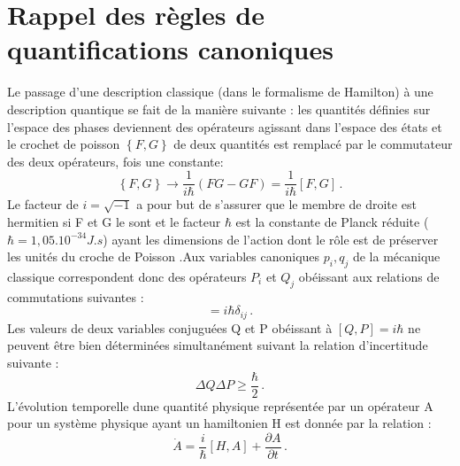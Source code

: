 \documentclass[12pt,a4paper, openany]{report}
\begin{document}
	\section{Rappel des règles de quantifications canoniques}
	Le passage d’une description classique (dans le formalisme de Hamilton) à une description quantique se fait de la manière suivante : les quantités définies sur l'espace des phases deviennent des opérateurs agissant dans l'espace des états et le crochet de poisson $\left\{F,G\right\}$ de deux quantités est remplacé par le commutateur des deux opérateurs, fois une constante:
	\begin{equation}
		\left\{F,G\right\} \rightarrow{\frac{1}{i{\hbar}}(FG-GF)}=\frac{1}{i{\hbar}}[F , G]\, .  
	\end{equation} 
Le facteur de $i=\sqrt{-1}$ a pour but de s’assurer que le membre de droite est hermitien si F et G le sont et le facteur $\hbar$ est la constante de Planck réduite ($\hbar=1,05.10^{-34} J.s$) ayant les dimensions de l'action dont le r\^{o}le est de préserver les unités du croche de Poisson .Aux variables canoniques $p_i , q_j$ de la mécanique classique correspondent donc des opérateurs $ P_i $ et $ Q_j $ obéissant aux relations de commutations suivantes :
\begin{equation}
	[Q_i ,P_j]=i{\hbar}{\delta}_{ij} \,.
\end{equation} 
Les valeurs de deux variables conjuguées Q et P obéissant à $[Q,P]=i{\hbar}$ ne peuvent \^{e}tre  bien déterminées simultanément suivant  la relation d'incertitude suivante : 
\begin{equation}
	\Delta{Q}\Delta{P}\geq\frac{\hbar}{2} \,.
\end{equation}
L'évolution temporelle dune quantité physique représentée par un opérateur A  pour un système physique ayant un hamiltonien H est donnée par la relation :
\begin{equation}
	\dot{A}=\frac{i}{\hbar}[H,A]+\frac{\partial{A}}{\partial{t}} \,.
\end{equation}
\end{document}
